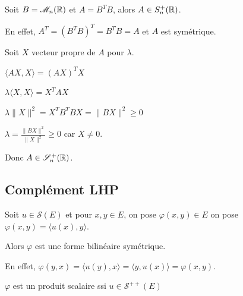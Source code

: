 \begin{exemple}
    Soit $B = \mathscr M_n(\mathbb{R})$ et $A = B^T B$, alors 
    $A \in S_n^+(\mathbb{R})$. 

    En effet, $A^T = (B^T B)^T = B^T B = A$ et $A$ est symétrique.

    Soit $X$ vecteur propre de $A$ pour $\lambda$. 

    $\langle AX, X \rangle = (AX)^T X$ 
    
    $\lambda \langle X, X \rangle = X^T A X$

    $\lambda \| X \|^2 = X^T B^T B X = \| BX \|^2 \geqslant 0$

    $\lambda = \frac{\|BX \|^2}{\| X \|^2} \geqslant 0$ car $X \neq 0$. 

    Donc $A \in \mathscr S_n^+(\mathbb{R})$. 
\end{exemple}

\subsection{Complément LHP}

Soit $u \in \mathscr S(E)$ et pour $x, y \in E$, on pose 
$\varphi(x, y) \in E$ on pose $\varphi(x, y) = \langle u(x), y \rangle$.

Alors $\varphi$ est une forme bilinéaire symétrique. 

En effet, 
$\varphi(y, x) = \langle u(y), x \rangle = \langle y, u(x) \rangle = \varphi(x, y)$. 

$\varphi$ est un produit scalaire ssi $u \in \mathscr S^{++}(E) $ 

